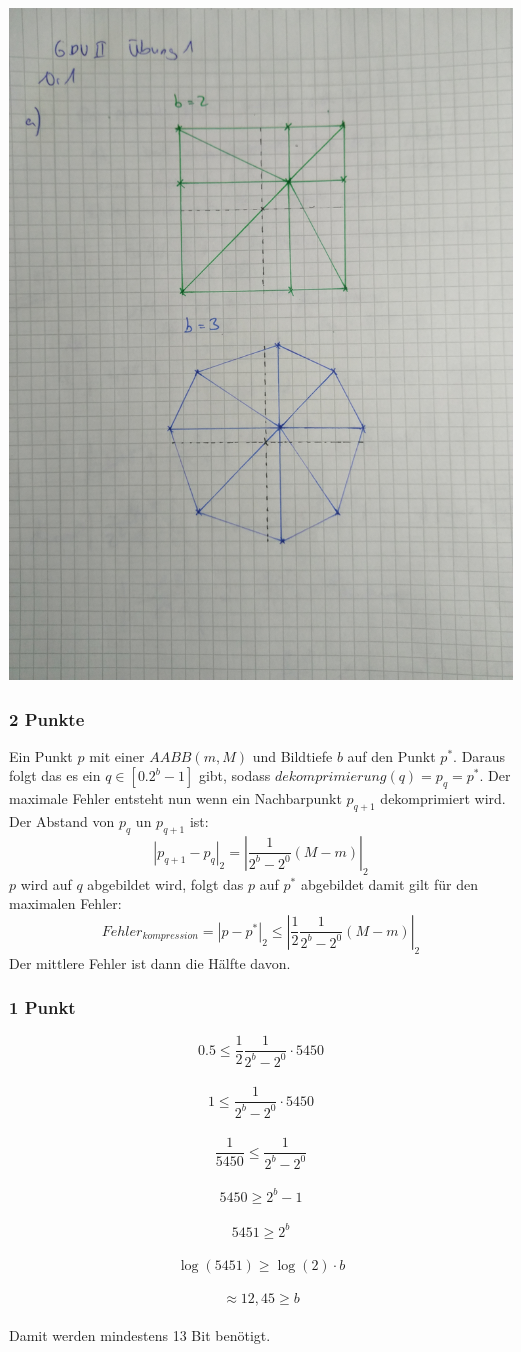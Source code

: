 \includegraphics[scale=0.25]{1a_Zeichnung_J.jpg}

\subsubsection{2 Punkte}
Ein Punkt $p$ mit einer $AABB(m,M)$ und Bildtiefe $b$ auf den Punkt $p^*$. Daraus folgt das es ein $q\in[0.2^b-1]$ gibt, sodass $dekomprimierung(q) = p_q = p^*$. Der maximale Fehler entsteht nun wenn ein Nachbarpunkt $p_{q+1}$ dekomprimiert wird. Der Abstand von $p_q$ un $p_{q+1}$ ist:\\
$$|p_{q+1}-p_q|_2 = |\frac{1}{2^b-2^0}(M-m)|_2$$
$p$ wird auf $q$ abgebildet wird, folgt das $p$ auf $p^*$ abgebildet damit gilt für den maximalen Fehler:\\
$$Fehler_{kompression} = | p - p^*|_2 \leq |\frac{1}{2} \frac{1}{2^b-2^0}(M-m)|_2 $$
Der mittlere Fehler ist dann die Hälfte davon.
\subsubsection{1 Punkt}
$$ 0.5 \leq \frac{1}{2} \frac{1}{2^b-2^0}\cdot5450 $$\\
$$ 1 \leq  \frac{1}{2^b-2^0}\cdot5450$$\\
$$ \frac{1}{5450} \leq  \frac{1}{2^b-2^0}$$\\
$$ 5450 \geq  2^b-1$$\\
$$ 5451 \geq  2^b$$\\
$$ \log(5451) \geq  \log(2)\cdot b$$\\
$$ \approx 12,45 \geq  b$$\\
Damit werden mindestens 13 Bit benötigt.

